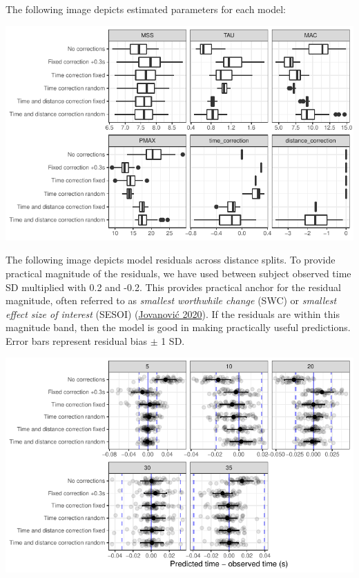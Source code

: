 \documentclass[fleqn,10pt,lineno]{wlpeerj} %
\begin{document}
The following image depicts estimated parameters for each model:

\begin{center}\includegraphics[width=0.9\linewidth]{paper_files/figure-latex/unnamed-chunk-58-1} \end{center}

The following image depicts model residuals across distance splits. To provide practical magnitude of the residuals, we have used between subject observed time SD multiplied with 0.2 and -0.2. This provides practical anchor for the residual magnitude, often referred to as \emph{smallest worthwhile change} (SWC) or \emph{smallest effect size of interest} (SESOI) (\protect\hyperlink{ref-jovanovicBmbstatsBootstrapMagnitudebased2020}{Jovanović 2020}). If the residuals are within this magnitude band, then the model is good in making practically useful predictions. Error bars represent residual bias \(\pm\) 1 SD.

\begin{center}\includegraphics[width=0.9\linewidth]{paper_files/figure-latex/unnamed-chunk-59-1} \end{center}
\end{document}
